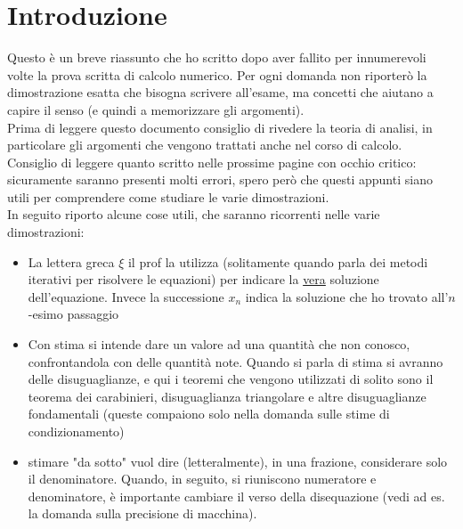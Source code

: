 \section{Introduzione}
Questo è un breve riassunto che ho scritto dopo aver fallito per innumerevoli volte la prova scritta di calcolo numerico. Per ogni domanda non riporterò la dimostrazione esatta che bisogna scrivere all'esame, ma concetti che aiutano a capire il senso (e quindi a memorizzare gli argomenti).\\
Prima di leggere questo documento consiglio di rivedere la teoria di analisi, in particolare gli argomenti che vengono trattati anche nel corso di calcolo.\\
Consiglio di leggere quanto scritto nelle prossime pagine con occhio critico: sicuramente saranno presenti molti errori, spero però che questi appunti siano utili per comprendere come studiare le varie dimostrazioni.\\
In seguito riporto alcune cose utili, che saranno ricorrenti nelle varie dimostrazioni:
\begin{itemize}
    \item La lettera greca $\xi$ il prof la utilizza (solitamente quando parla dei metodi iterativi per risolvere le equazioni) per indicare la \underline{vera} soluzione dell'equazione. Invece la successione ${x_n}$ indica la soluzione che ho trovato all'$n$-esimo passaggio
    \item Con stima si intende dare un valore ad una quantità che non conosco, confrontandola con delle quantità note. Quando si parla di stima si avranno delle disuguaglianze, e qui i teoremi che vengono utilizzati di solito sono il teorema dei carabinieri, disuguaglianza triangolare e altre disuguaglianze fondamentali (queste compaiono solo nella domanda sulle stime di condizionamento)
    \item stimare "da sotto" vuol dire (letteralmente), in una frazione, considerare solo il denominatore. Quando, in seguito, si riuniscono numeratore e denominatore, è importante cambiare il verso della disequazione (vedi ad es. la domanda sulla precisione di macchina).
\end{itemize}